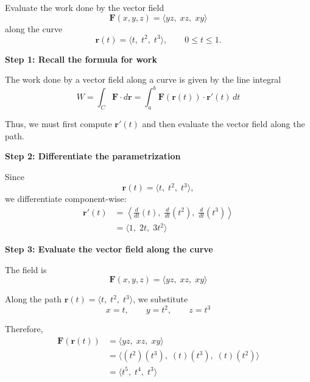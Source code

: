 \begin{examplebox}
    Evaluate the work done by the vector field
    \begin{equation*}
        \mathbf{F}(x,y,z)=\langle yz,\; xz,\; xy \rangle
    \end{equation*}
    along the curve
    \begin{equation*}
        \mathbf{r}(t)=\langle t,\; t^2,\; t^3 \rangle, \qquad 0 \le t \le 1.
    \end{equation*}

    \textbf{Step 1: Recall the formula for work}

    The work done by a vector field along a curve is given by the line integral
    \begin{equation*}
        W=\int_C \mathbf{F}\cdot d\mathbf{r}
        =\int_a^b \mathbf{F}(\mathbf{r}(t))\cdot \mathbf{r}'(t)\,dt
    \end{equation*}

    Thus, we must first compute $\mathbf{r}'(t)$ and then evaluate the vector field along the path.

    \textbf{Step 2: Differentiate the parametrization}

    Since
    \begin{equation*}
        \mathbf{r}(t)=\langle t,\; t^2,\; t^3 \rangle,
    \end{equation*}
    we differentiate component-wise:
    \begin{align*}
        \mathbf{r}'(t)
         & = \left\langle \frac{d}{dt}(t),\; \frac{d}{dt}(t^2),\; \frac{d}{dt}(t^3) \right\rangle \\
         & = \langle 1,\; 2t,\; 3t^2 \rangle
    \end{align*}

    \textbf{Step 3: Evaluate the vector field along the curve}

    The field is
    \begin{equation*}
        \mathbf{F}(x,y,z)=\langle yz,\; xz,\; xy \rangle
    \end{equation*}

    Along the path $\mathbf{r}(t)=\langle t,\; t^2,\; t^3 \rangle$, we substitute
    \begin{equation*}
        x=t,\qquad y=t^2,\qquad z=t^3
    \end{equation*}

    Therefore,
    \begin{align*}
        \mathbf{F}(\mathbf{r}(t))
         & = \langle yz,\; xz,\; xy \rangle                     \\
         & = \langle (t^2)(t^3),\; (t)(t^3),\; (t)(t^2) \rangle \\
         & = \langle t^5,\; t^4,\; t^3 \rangle
    \end{align*}


\end{examplebox}
